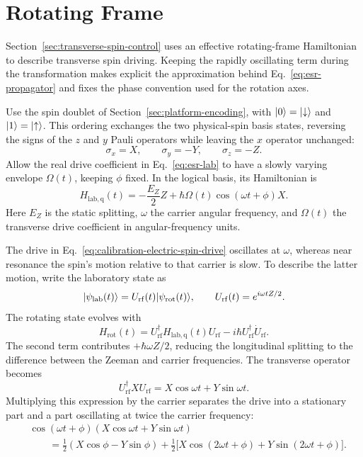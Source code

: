 \FloatBarrier
\section{Rotating Frame}
\label{app:spin-driving}
\label{sec:calibration-spin-drive}
\label{sec:drive-confined-spin}
\label{sec:drive-rotating-frame}

Section~\ref{sec:transverse-spin-control} uses an effective
rotating-frame Hamiltonian to describe transverse spin driving.
Keeping the rapidly oscillating term during the transformation
makes explicit the approximation behind
Eq.~\eqref{eq:esr-propagator} and fixes the phase convention used
for the rotation axes.

Use the spin doublet of Section~\ref{sec:platform-encoding}, with
$\lvert 0\rangle=\lvert \downarrow\rangle$ and $\lvert 1\rangle=\lvert \uparrow\rangle$.
This ordering exchanges the two physical-spin basis states,
reversing the signs of the $z$ and $y$ Pauli operators while
leaving the $x$ operator unchanged:
\[
 \sigma_x=X,\qquad \sigma_y=-Y,\qquad \sigma_z=-Z.
\]
Allow the real drive coefficient in Eq.~\eqref{eq:esr-lab} to
have a slowly varying envelope $\Omega(t)$, keeping $\phi$ fixed.
In the logical basis, its Hamiltonian is
\begin{equation}
 H_{\mathrm{lab,q}}(t)
 =-\frac{E_Z}{2}Z
   +\hbar\Omega(t)\cos(\omega t+\phi)X.
 \label{eq:calibration-electric-spin-drive}
\end{equation}
Here $E_Z$ is the static splitting, $\omega$ the carrier angular
frequency, and $\Omega(t)$ the transverse drive coefficient in
angular-frequency units.

The drive in Eq.~\eqref{eq:calibration-electric-spin-drive}
oscillates at $\omega$, whereas near resonance the spin's motion
relative to that carrier is slow. To describe the latter motion,
write the laboratory state as
\[
 \lvert \psi_{\mathrm{lab}}(t)\rangle
 =U_{\mathrm{rf}}(t)\lvert \psi_{\mathrm{rot}}(t)\rangle,\qquad
 U_{\mathrm{rf}}(t)=e^{i\omega tZ/2}.
\]
The rotating state evolves with
\begin{equation}
 H_{\mathrm{rot}}(t)
 =U_{\mathrm{rf}}^\dagger H_{\mathrm{lab,q}}(t)U_{\mathrm{rf}}
  -i\hbar U_{\mathrm{rf}}^\dagger\dot U_{\mathrm{rf}}.
 \label{eq:calibration-rotating-frame-transform}
\end{equation}
The second term contributes $+\hbar\omega Z/2$, reducing the
longitudinal splitting to the difference between the Zeeman and
carrier frequencies. The transverse operator becomes
\[
 U_{\mathrm{rf}}^\dagger XU_{\mathrm{rf}}
 =X\cos\omega t+Y\sin\omega t.
\]
Multiplying this expression by the carrier separates the drive
into a stationary part and a part oscillating at twice the
carrier frequency:
\[
 \begin{aligned}
 &\cos(\omega t+\phi)
       (X\cos\omega t+Y\sin\omega t)\\
 &\qquad=\frac12(X\cos\phi-Y\sin\phi)
       +\frac12\bigl[X\cos(2\omega t+\phi)
                    +Y\sin(2\omega t+\phi)\bigr].
 \end{aligned}
\]

